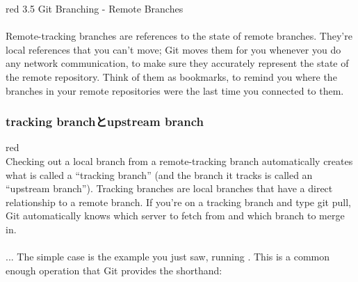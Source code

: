 \documentclass[10pt,a4j,openany,dvipdfmx]{jsarticle}
\begin{document}
\begin{ColorReferenceBox}{red}
3.5 Git Branching - Remote Branches\\
\\
Remote-tracking branches are references to the state of remote branches. They’re local references that you can’t move; Git moves them for you whenever you do any network communication, to make sure they accurately represent the state of the remote repository. Think of them as bookmarks, to remind you where the branches in your remote repositories were the last time you connected to them.\\

\end{ColorReferenceBox}

\subsubsection{tracking branchとupstream branch} %
\label{ssub:tracking_branchとupstream_branch}


\begin{ColorReferenceBox}{red}
\\
Checking out a local branch from a remote-tracking branch automatically creates what is called a “tracking branch” (and the branch it tracks is called an “upstream branch”). Tracking branches are local branches that have a direct relationship to a remote branch. If you’re on a tracking branch and type git pull, Git automatically knows which server to fetch from and which branch to merge in.\\
\\
... The simple case is the example you just saw, running . This is a common enough operation that Git provides the   shorthand:
\end{ColorReferenceBox}
\end{document}
